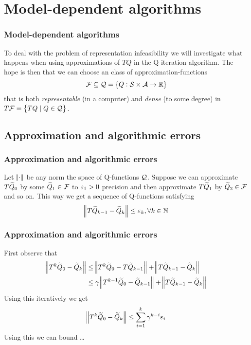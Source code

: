 \documentclass{beamer}[10]
\begin{document}
\section{Model-dependent algorithms}

\begin{frame}
  \frametitle{Model-dependent algorithms}
  To deal with the problem of representation infeasibility we will investigate
  what happens when using approximations of $TQ$ in the Q-iteration algorithm.
  The hope is then that we can choose an class of approximation-functions
  \[ \mathcal{F} \subseteq \mathcal{Q} = \{ Q : \mathcal{S} \times \mathcal{A} \to \mathbb{R} \} \]
  that is both \emph{representable} (in a computer) and \emph{dense}
  (to some degree) in $T \mathcal{F} = \left\{ TQ \mid Q \in \mathcal{Q} \right\}$.
\end{frame}

\subsection{Approximation and algorithmic errors}

\begin{frame}
  \frametitle{Approximation and algorithmic errors}
  Let $\norm{\cdot}$ be any norm the space of Q-functions $\mathcal{Q}$.
  Suppose we can approximate $T\widetilde{Q}_0$ by some $\widetilde{Q}_1 \in \mathcal{F}$
  to $\varepsilon_1 > 0$ precision
  and then approximate $T\widetilde{Q}_1$ by $\widetilde{Q}_2 \in \mathcal{F}$
  and so on. This way we get a sequence of Q-functions satisfying
  \begin{equation*}
    \norm{T\widetilde{Q}_{k-1} - \widetilde{Q}_k} \leq \varepsilon_k, \forall k \in \mathbb{N}
    \label{eq:defnvei}
  \end{equation*}
\end{frame}

\begin{frame}
  \frametitle{Approximation and algorithmic errors}
  First observe that
  \begin{align*}
    \norm{T^k \widetilde{Q}_0 - \widetilde{Q}_k}
    &\leq \norm{T^k \widetilde{Q}_0 - T \widetilde{Q}_{k-1}} + \norm{T\widetilde{Q}_{k-1} - \widetilde{Q}_k}
    \\ &\leq \gamma \norm{T^{k-1} \widetilde{Q}_0 - \widetilde{Q}_{k-1}}
    + \norm{T\widetilde{Q}_{k-1} - \widetilde{Q}_k}
  \end{align*}
  Using this iteratively we get
  \begin{equation*}
    \norm{T^k \widetilde{Q}_0 - \widetilde{Q}_k} \leq \sum_{i=1}^k \gamma^{k-i} \varepsilon_i
  \end{equation*}
  Using this we can bound \ldots
\end{frame}
\end{document}
